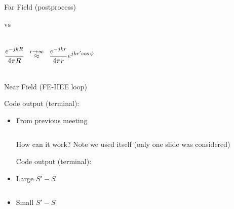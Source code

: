 \begin{frame}[allowframebreaks]{Far Field (postprocess)}
\begin{block}{{\GreenD} vs {\GreenT}}
\begin{columns}
      \begin{equation*}
        \dfrac{e^{-jkR}}{4\pi R}
         \enskip \overset{r\rightarrow\infty}{\approx}  \enskip
        \dfrac{e^{-jkr}}{4\pi r} e^{j k r^\prime\! \cos\psi}
      \end{equation*}

    \end{columns}
    
    \end{block}


  \end{frame}

  

\begin{frame}[allowframebreaks]{Near Field (FE-IIEE loop)}
  


 Code output (terminal):

 \begin{itemize}
 \item From previous meeting %
   \begin{columns}%
    {\GreenD} 
    {\GreenT} 
 \end{columns}   

 

 \vspace{\baselineskip}

 \alert{How can it work?} Note we used {\GreenT} itself (only one
 slide was considered)
 
 
 \framebreak %

 Code output (terminal):

 \item Large $S'-S$
   \begin{columns}[T]
    {\GreenD} 
    {\GreenT} 
 \end{columns}   

 
 
\item Small $S'-S$
   \begin{columns}%
    {\GreenD} 
    {\GreenT} 
 \end{columns}   

 

 
\end{itemize}

\end{frame}

